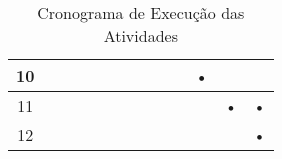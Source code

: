 \documentclass[12pt]{article}
\begin{document}
\begin{table}[htbp]
\begin{tabular}{|c|c|c|c|c|c|c|c|c|c|c|c|c|}
		10                  &            &            &           &            &            &           &            &            &           & •          &            &           \\ \hline
		11                  &            &            &           &            &            &           &            &            &        &           & •          & •         \\ \hline
		12                  &            &            &           &            &            &           &            &            &           &            &            & •         \\ \hline
		\end{tabular}
	\caption{Cronograma de Execução das Atividades}
	\label{tab:cronograma}
\end{table}


\end{document}
